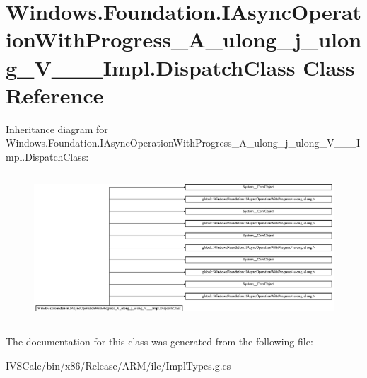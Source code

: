 \hypertarget{class_windows_1_1_foundation_1_1_i_async_operation_with_progress___a__ulong__j__ulong___v_______impl_1_1_dispatch_class}{}\section{Windows.\+Foundation.\+I\+Async\+Operation\+With\+Progress\+\_\+\+A\+\_\+ulong\+\_\+j\+\_\+ulong\+\_\+\+V\+\_\+\+\_\+\+\_\+\+Impl.\+Dispatch\+Class Class Reference}
\label{class_windows_1_1_foundation_1_1_i_async_operation_with_progress___a__ulong__j__ulong___v_______impl_1_1_dispatch_class}
Inheritance diagram for Windows.\+Foundation.\+I\+Async\+Operation\+With\+Progress\+\_\+\+A\+\_\+ulong\+\_\+j\+\_\+ulong\+\_\+\+V\+\_\+\+\_\+\+\_\+\+Impl.\+Dispatch\+Class\+:\begin{figure}[H]
\begin{center}
\leavevmode
\includegraphics[height=5.539568cm]{class_windows_1_1_foundation_1_1_i_async_operation_with_progress___a__ulong__j__ulong___v_______impl_1_1_dispatch_class}
\end{center}
\end{figure}


The documentation for this class was generated from the following file\+:\begin{DoxyCompactItemize}
\item 
I\+V\+S\+Calc/bin/x86/\+Release/\+A\+R\+M/ilc/Impl\+Types.\+g.\+cs\end{DoxyCompactItemize}
